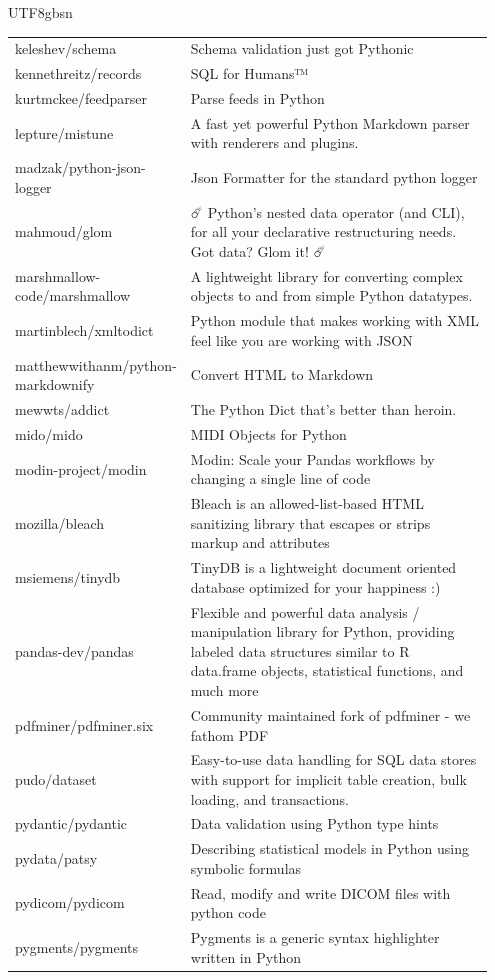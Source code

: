 \begin{CJK*}{UTF8}{gbsn}
\begin{longtable}{p{0.3\linewidth} | p{0.65\linewidth}}
keleshev/schema & Schema validation just got Pythonic \\
kennethreitz/records & SQL for Humans™ \\
kurtmckee/feedparser & Parse feeds in Python \\
lepture/mistune & A fast yet powerful Python Markdown parser with renderers and plugins. \\
madzak/python-json-logger & Json Formatter for the standard python logger \\
mahmoud/glom & ☄️ Python's nested data operator (and CLI), for all your declarative restructuring needs. Got data? Glom it! ☄️ \\
marshmallow-code/marshmallow & A lightweight library for converting complex objects to and from simple Python datatypes. \\
martinblech/xmltodict & Python module that makes working with XML feel like you are working with JSON \\
matthewwithanm/python-markdownify & Convert HTML to Markdown \\
mewwts/addict & The Python Dict that's better than heroin. \\
mido/mido & MIDI Objects for Python \\
modin-project/modin & Modin: Scale your Pandas workflows by changing a single line of code \\
mozilla/bleach & Bleach is an allowed-list-based HTML sanitizing library that escapes or strips markup and attributes \\
msiemens/tinydb & TinyDB is a lightweight document oriented database optimized for your happiness :) \\
pandas-dev/pandas & Flexible and powerful data analysis / manipulation library for Python, providing labeled data structures similar to R data.frame objects, statistical functions, and much more \\
pdfminer/pdfminer.six & Community maintained fork of pdfminer - we fathom PDF \\
pudo/dataset & Easy-to-use data handling for SQL data stores with support for implicit table creation, bulk loading, and transactions. \\
pydantic/pydantic & Data validation using Python type hints \\
pydata/patsy & Describing statistical models in Python using symbolic formulas \\
pydicom/pydicom & Read, modify and write DICOM files with python code \\
pygments/pygments & Pygments is a generic syntax highlighter written in Python \\

\end{longtable}
\end{CJK*}
